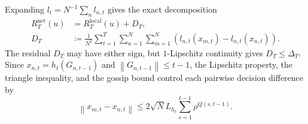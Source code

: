 \documentclass[12pt,english]{reviewresponse}
\newcommand{\norm}[1]{\left\lVert#1\right\rVert}
\begin{document}
\begin{revresponse}
\begin{changes}
        Expanding $l_t=N^{-1}\sum_n l_{n,t}$ gives the exact decomposition
        \begin{align*}
            R_T^{\mathrm{net}}(u) & =R_T^{\mathrm{local}}(u)+D_T,                              \\
            D_T                   & \coloneqq\frac{1}{N^2}\sum_{t=1}^T\sum_{n=1}^N\sum_{m=1}^N
            \left(l_{n,t}(x_{m,t})-l_{n,t}(x_{n,t})\right).
        \end{align*}
        The residual $D_T$ may have either sign, but $1$-Lipschitz continuity gives $D_T\leq\Delta_T$.
        Since $x_{n,t}=h_t(G_{n,t-1})$ and $\norm{G_{n,t-1}}\leq t-1$, the Lipschitz property, the triangle inequality, and the gossip bound control each pairwise decision difference by
        \begin{equation*}
            \norm{x_{m,t}-x_{n,t}}
            \leq2\sqrt{N}L_{h_t}\sum_{s=1}^{t-1}\rho^{Q(s,t-1)}.
        \end{equation*}
    \end{changes}
\end{revresponse}
\end{document}
